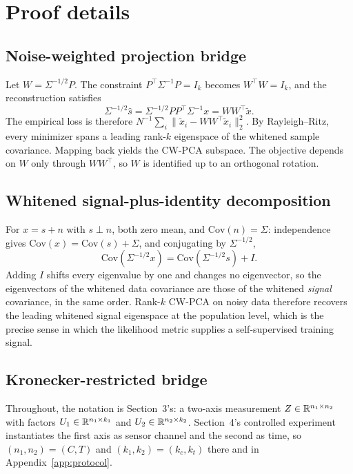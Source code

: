 \section{Proof details}
\label{app:proofs}

\subsection{Noise-weighted projection bridge}

Let $W=\Sigma^{-1/2}P$. The constraint $P^\top\Sigma^{-1}P=I_k$ becomes $W^\top W=I_k$, and the reconstruction satisfies
\[
 \Sigma^{-1/2}\hat{s}
 =\Sigma^{-1/2}PP^\top\Sigma^{-1}x
 =WW^\top\tilde{x}.
\]
The empirical loss is therefore $N^{-1}\sum_i\|\tilde{x}_i-WW^\top\tilde{x}_i\|_2^2$. By Rayleigh--Ritz, every minimizer spans a leading rank-$k$ eigenspace of the whitened sample covariance. Mapping back yields the CW-PCA subspace. The objective depends on $W$ only through $WW^\top$, so $W$ is identified up to an orthogonal rotation.

\subsection{Whitened signal-plus-identity decomposition}

For $x=s+n$ with $s\perp n$, both zero mean, and $\mathrm{Cov}(n)=\Sigma$: independence gives $\mathrm{Cov}(x)=\mathrm{Cov}(s)+\Sigma$, and conjugating by $\Sigma^{-1/2}$,
\[
 \mathrm{Cov}(\Sigma^{-1/2}x)=\mathrm{Cov}(\Sigma^{-1/2}s)+I.
\]
Adding $I$ shifts every eigenvalue by one and changes no eigenvector, so the eigenvectors of the whitened data covariance are those of the whitened \emph{signal} covariance, in the same order. Rank-$k$ CW-PCA on noisy data therefore recovers the leading whitened signal eigenspace at the population level, which is the precise sense in which the likelihood metric supplies a self-supervised training signal.

\subsection{Kronecker-restricted bridge}

Throughout, the notation is Section~3's: a two-axis measurement $Z\in\mathbb{R}^{n_1\times n_2}$ with factors $U_1\in\mathbb{R}^{n_1\times k_1}$ and $U_2\in\mathbb{R}^{n_2\times k_2}$. Section~4's controlled experiment instantiates the first axis as sensor channel and the second as time, so $(n_1,n_2)=(C,T)$ and $(k_1,k_2)=(k_c,k_t)$ there and in Appendix~\ref{app:protocol}.

